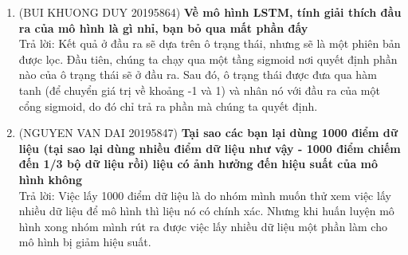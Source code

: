 \documentclass[13pt]{report}
\numberwithin{equation}{section}
\begin{document}
\begin{enumerate}
    \item (BUI KHUONG DUY 20195864)\textbf{
    Về mô hình LSTM, tính giải thích đầu ra của mô hình là gì nhỉ, bạn bỏ qua mất phần đấy}\\
    Trả lời: Kết quả ở đầu ra sẽ dựa trên ô trạng thái, nhưng sẽ là một phiên bản được lọc. Đầu tiên, chúng ta chạy qua một tầng sigmoid nơi quyết định phần nào của ô trạng thái sẽ ở đầu ra. Sau đó, ô trạng thái được đưa qua hàm tanh (để chuyển giá trị về khoảng -1 và 1) và nhân nó với đầu ra của một cổng sigmoid, do đó chỉ trả ra phần mà chúng ta quyết định.
    
    \item (NGUYEN VAN DAI 20195847)\textbf{
    Tại sao các bạn lại dùng 1000 điểm dữ liệu (tại sao lại dùng nhiều điểm dữ liệu như vậy - 1000 điểm chiếm đến 1/3 bộ dữ liệu rồi) liệu có ảnh hưởng đến hiệu suất của mô hình không}\\
    Trả lời: Việc lấy 1000 điểm dữ liệu là do nhóm mình muốn thử xem việc lấy nhiều dữ liệu để mô hình thì liệu nó có chính xác. Nhưng khi huấn luyện mô hình xong nhóm mình rút ra được việc lấy nhiều dữ liệu một phần làm cho mô hình bị giảm hiệu suất.

\end{enumerate}	
\end{document}
